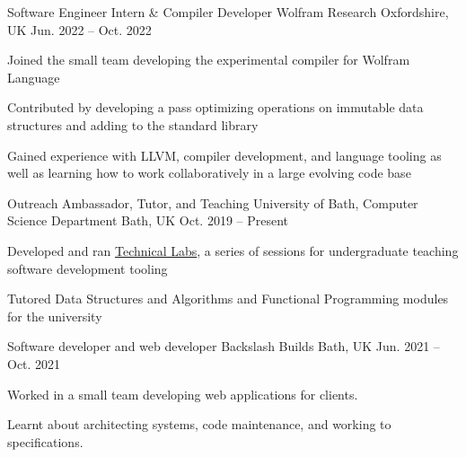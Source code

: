 


\begin{cventries}


\cventry
{Software Engineer Intern \& Compiler Developer} %
{Wolfram Research} %
{Oxfordshire, UK} %
{Jun. 2022 -- Oct. 2022} %
{ %
\begin{cvitems}
\item {Joined the small team developing the experimental compiler for Wolfram Language}
\item {Contributed by developing a pass optimizing operations on immutable data structures 
  and adding to the standard library}
\item {Gained experience with LLVM, compiler development, and language tooling as well as
  learning how to work collaboratively in a large evolving code base}
\end{cvitems}
}


\cventry
{Outreach Ambassador, Tutor, and Teaching} %
{University of Bath, Computer Science Department} %
{Bath, UK} %
{Oct. 2019 -- Present} %
{ %
\begin{cvitems}
\item {Developed and ran \href{https://www.technical-labs.link/notes/2020/}{Technical Labs}, a series of 
  sessions for undergraduate teaching software development tooling}
\item {Tutored Data Structures and Algorithms and Functional Programming modules for the university}
\end{cvitems}
}


\cventry
{Software developer and web developer} %
{Backslash Builds} %
{Bath, UK} %
{Jun. 2021 -- Oct. 2021} %
{ %
\begin{cvitems}
\item {Worked in a small team developing web applications for clients.}
\item {Learnt about architecting systems, code maintenance, and working to specifications.}
\end{cvitems}
}

\end{cventries}
